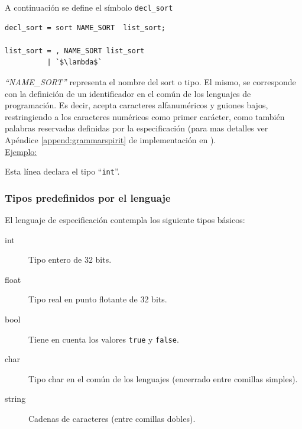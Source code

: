 A continuación se define el símbolo \texttt{decl\_sort}

\vspace{0.3cm}
\begin{lstlisting}[frame=shadowbox, rulesepcolor=\color{azul}, language=specmag, linewidth=10cm]
decl_sort = sort NAME_SORT  list_sort;

list_sort = , NAME_SORT list_sort
          | `$\lambda$`
\end{lstlisting}
\vspace{0.3cm}

\textit{``NAME\_SORT''} representa el nombre del sort o tipo. El mismo, se corresponde con la definición de un identificador en el común de los lenguajes de programación. Es decir, acepta caracteres alfanuméricos y guiones bajos, restringiendo a los caracteres numéricos como primer carácter, como también palabras reservadas definidas por la especificación (para mas detalles ver Apéndice \ref{append:grammarspirit} de implementación en \spirit).\\

\underline{Ejemplo:} \begin{center}  \end{center}
\vspace{0.2cm}
Esta línea declara el tipo ``\texttt{int}''.

\subsubsection*{Tipos predefinidos por el lenguaje}
\label{sec:typepredefined}

El lenguaje de especificación contempla los siguiente tipos básicos:

\begin{description}
\item [int] Tipo entero de 32 bits.

\item [float] Tipo real en punto flotante de 32 bits.

\item [bool] Tiene en cuenta los valores \texttt{true} y \texttt{false}.

\item [char] Tipo char en el común de los lenguajes (encerrado entre comillas simples).

\item [string] Cadenas de caracteres (entre comillas dobles).
\end{description}

